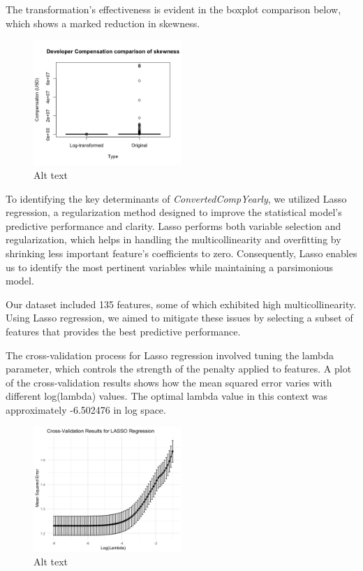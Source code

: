 \documentclass[
  12pt,
]{article}
\begin{document}
The transformation's effectiveness is evident in the boxplot comparison
below, which shows a marked reduction in skewness.

\begin{figure}
\centering
\includegraphics[width=0.5\textwidth,height=0.5\textheight]{comparison_of_skewness.png}
\caption{Alt text}
\end{figure}

To identifying the key determinants of \emph{ConvertedCompYearly}, we
utilized Lasso regression, a regularization method designed to improve
the statistical model's predictive performance and clarity. Lasso
performs both variable selection and regularization, which helps in
handling the multicollinearity and overfitting by shrinking less
important feature's coefficients to zero. Consequently, Lasso enables us
to identify the most pertinent variables while maintaining a
parsimonious model.

Our dataset included 135 features, some of which exhibited high
multicollinearity. Using Lasso regression, we aimed to mitigate these
issues by selecting a subset of features that provides the best
predictive performance.

The cross-validation process for Lasso regression involved tuning the
lambda parameter, which controls the strength of the penalty applied to
features. A plot of the cross-validation results shows how the mean
squared error varies with different log(lambda) values. The optimal
lambda value in this context was approximately -6.502476 in log space.

\begin{figure}
\centering
\includegraphics[width=0.5\textwidth,height=0.5\textheight]{cross_validation_results.png}
\caption{Alt text}
\end{figure}
\end{document}
